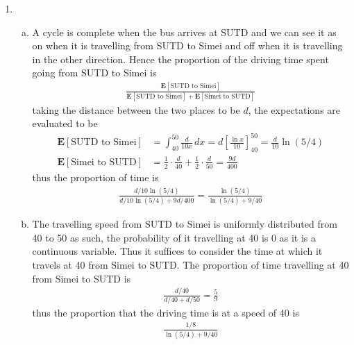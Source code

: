 \documentclass[a4paper,10pt]{article}
\theoremstyle{definition}
\begin{document}
\begin{enumerate}
\item 
\begin{enumerate}[(a)]
\item A cycle is complete when the bus arrives at SUTD and we can see it as on when it is travelling from SUTD to Simei and off when it is travelling in the other direction. Hence the proportion of the driving time spent going from SUTD to Simei is 
\begin{align*}
\frac{\mathbf{E}[\text{SUTD to Simei}]}{\mathbf{E}[\text{SUTD to Simei}]+\mathbf{E}[\text{Simei to SUTD}]}
\end{align*}
taking the distance between the two places to be $d$, the expectations are evaluated to be
\begin{align*}
\mathbf{E}[\text{SUTD to Simei}]&=\int_{40}^{50}\frac{d}{10x}\,dx=d\left[\frac{\ln x}{10}\right]_{40}^{50}=\frac{d}{10}\ln(5/4)\\
\mathbf{E}[\text{Simei to SUTD}]&= \frac{1}{2}\cdot\frac{d}{40}+\frac{1}{2}\cdot\frac{d}{50}=\frac{9d}{400}
\end{align*}
thus the proportion of time is 
\begin{align*}
\frac{d/10\ln(5/4)}{d/10\ln(5/4)+9d/400}=\frac{\ln(5/4)}{\ln(5/4)+9/40}
\end{align*}
\item The travelling speed from SUTD to Simei is uniformly distributed from 40 to 50 as such, the probability of it travelling at 40 is 0 as it is a continuous variable. Thus it suffices to consider the time at which it travels at 40 from Simei to SUTD. The proportion of time travelling at 40 from Simei to SUTD is 
\begin{align*}
\frac{d/40}{d/40+d/50}=\frac{5}{9}
\end{align*}
thus the proportion that the driving time is at a speed of 40 is 
\begin{align*}
\frac{1/8}{\ln(5/4)+9/40}
\end{align*}
\end{enumerate}

\end{enumerate}
\end{document}
